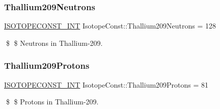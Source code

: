 \subsubsection{\texorpdfstring{Thallium209\+Neutrons}{Thallium209Neutrons}}
{\footnotesize\ttfamily \mbox{\hyperlink{group___isotope_const-_macros_ga5f18360b3e99483a35c32d789e62621c}{I\+S\+O\+T\+O\+P\+E\+C\+O\+N\+S\+T\+\_\+\+I\+NT}} Isotope\+Const\+::\+Thallium209\+Neutrons = 128}

\$ \$ Neutrons in Thallium-\/209. \mbox{\label{group___isotope_const-_thallium-_tl209_ga99d84b97142d59f55fb1757ec65f1499}} 
\subsubsection{\texorpdfstring{Thallium209\+Protons}{Thallium209Protons}}
{\footnotesize\ttfamily \mbox{\hyperlink{group___isotope_const-_macros_ga5f18360b3e99483a35c32d789e62621c}{I\+S\+O\+T\+O\+P\+E\+C\+O\+N\+S\+T\+\_\+\+I\+NT}} Isotope\+Const\+::\+Thallium209\+Protons = 81}

\$ \$ Protons in Thallium-\/209. 
